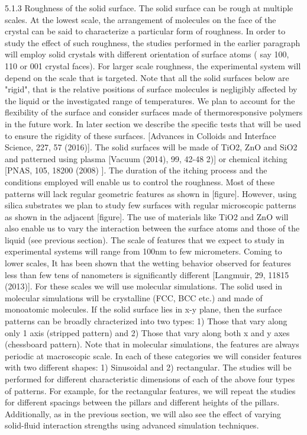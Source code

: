 \par 5.1.3 Roughness of the solid surface. The solid surface can be rough at multiple scales. At the lowest scale, the arrangement of molecules on the face of the crystal can be said to characterize a particular form of roughness. In order to study the effect of such roughness, the studies performed in the earlier paragraph will employ solid crystals with different orientation of surface atoms ( say 100, 110 or 001 crystal faces). For larger scale roughness, the experimental system will depend on the scale that is targeted. Note that all the solid surfaces below are "rigid", that is the relative positions of surface molecules is negligibly affected by the liquid or the investigated range of temperatures. We plan to account for the flexibility of the surface and consider surfaces made of thermoresponsive polymers in the future work. In later section we describe the specific tests that will be used to ensure the rigidity of these surfaces. [Advances in Colloids and Interface Science, 227, 57 (2016)]. The solid surfaces will be made of TiO2, ZnO and SiO2 and patterned using plasma [Vacuum (2014), 99, 42-48 2)] or chemical itching [PNAS, 105, 18200 (2008) ]. The duration of the itching process and the conditions employed will enable us to control the roughness. Most of these patterns will lack regular geometric features as shown in [figure]. However, using silica substrates we plan to study few surfaces with regular microscopic patterns as shown in the adjacent [figure]. The use of materials like TiO2 and ZnO will also enable us to vary the interaction between the surface atoms and those of the liquid (see previous section). The scale of features that we expect to study in experimental systems will range from 100nm to few micrometers. Coming to lower scales, It has been shown that the wetting behavior observed for features less than few tens of nanometers is significantly different [Langmuir, 29, 11815 (2013)]. For these scales we will use molecular simulations. The solid used in molecular simulations will be crystalline (FCC, BCC etc.) and made of monoatomic molecules. If the solid surface lies in x-y plane, then the surface patterns can be broadly chracterized into two types: 1) Those that vary along only 1 axis (stripped pattern) and 2) Those that vary along both x and y axes (chessboard pattern).  Note that in molecular simulations, the features are always periodic at macroscopic scale. In each of these categories we will consider features with two different shapes: 1) Sinusoidal and 2) rectangular. The studies will be performed for different characteristic dimensions of each of the above four types of patterns. For example, for the rectangular features, we will repeat the studies for different spacings between the pillars and different heights of the pillars.  Additionally, as in the previous section, we will also see the effect of varying solid-fluid interaction strengths using advanced simulation techniques.
